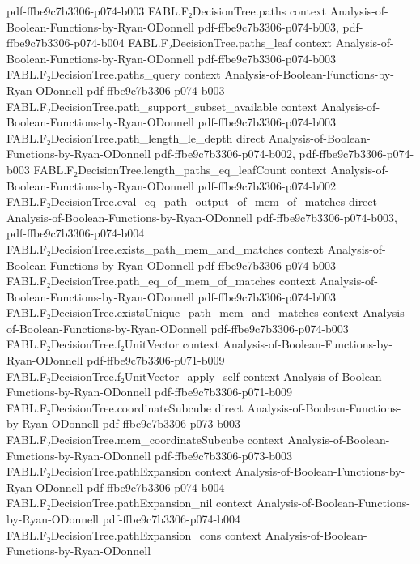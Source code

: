 \begin{theorem}
  {pdf-ffbe9c7b3306-p074-b003}
\proofstep
  {FABL.F₂DecisionTree.paths}
  {context}
  {Analysis-of-Boolean-Functions-by-Ryan-ODonnell}
  {pdf-ffbe9c7b3306-p074-b003,
    pdf-ffbe9c7b3306-p074-b004}
\proofstep
  {FABL.F₂DecisionTree.paths_leaf}
  {context}
  {Analysis-of-Boolean-Functions-by-Ryan-ODonnell}
  {pdf-ffbe9c7b3306-p074-b003}
\proofstep
  {FABL.F₂DecisionTree.paths_query}
  {context}
  {Analysis-of-Boolean-Functions-by-Ryan-ODonnell}
  {pdf-ffbe9c7b3306-p074-b003}
\proofstep
  {FABL.F₂DecisionTree.path_support_subset_available}
  {context}
  {Analysis-of-Boolean-Functions-by-Ryan-ODonnell}
  {pdf-ffbe9c7b3306-p074-b003}
\proofstep
  {FABL.F₂DecisionTree.path_length_le_depth}
  {direct}
  {Analysis-of-Boolean-Functions-by-Ryan-ODonnell}
  {pdf-ffbe9c7b3306-p074-b002,
    pdf-ffbe9c7b3306-p074-b003}
\proofstep
  {FABL.F₂DecisionTree.length_paths_eq_leafCount}
  {context}
  {Analysis-of-Boolean-Functions-by-Ryan-ODonnell}
  {pdf-ffbe9c7b3306-p074-b002}
\proofstep
  {FABL.F₂DecisionTree.eval_eq_path_output_of_mem_of_matches}
  {direct}
  {Analysis-of-Boolean-Functions-by-Ryan-ODonnell}
  {pdf-ffbe9c7b3306-p074-b003,
    pdf-ffbe9c7b3306-p074-b004}
\proofstep
  {FABL.F₂DecisionTree.exists_path_mem_and_matches}
  {context}
  {Analysis-of-Boolean-Functions-by-Ryan-ODonnell}
  {pdf-ffbe9c7b3306-p074-b003}
\proofstep
  {FABL.F₂DecisionTree.path_eq_of_mem_of_matches}
  {context}
  {Analysis-of-Boolean-Functions-by-Ryan-ODonnell}
  {pdf-ffbe9c7b3306-p074-b003}
\proofstep
  {FABL.F₂DecisionTree.existsUnique_path_mem_and_matches}
  {context}
  {Analysis-of-Boolean-Functions-by-Ryan-ODonnell}
  {pdf-ffbe9c7b3306-p074-b003}
\proofstep
  {FABL.F₂DecisionTree.f₂UnitVector}
  {context}
  {Analysis-of-Boolean-Functions-by-Ryan-ODonnell}
  {pdf-ffbe9c7b3306-p071-b009}
\proofstep
  {FABL.F₂DecisionTree.f₂UnitVector_apply_self}
  {context}
  {Analysis-of-Boolean-Functions-by-Ryan-ODonnell}
  {pdf-ffbe9c7b3306-p071-b009}
\proofstep
  {FABL.F₂DecisionTree.coordinateSubcube}
  {direct}
  {Analysis-of-Boolean-Functions-by-Ryan-ODonnell}
  {pdf-ffbe9c7b3306-p073-b003}
\proofstep
  {FABL.F₂DecisionTree.mem_coordinateSubcube}
  {context}
  {Analysis-of-Boolean-Functions-by-Ryan-ODonnell}
  {pdf-ffbe9c7b3306-p073-b003}
\proofstep
  {FABL.F₂DecisionTree.pathExpansion}
  {context}
  {Analysis-of-Boolean-Functions-by-Ryan-ODonnell}
  {pdf-ffbe9c7b3306-p074-b004}
\proofstep
  {FABL.F₂DecisionTree.pathExpansion_nil}
  {context}
  {Analysis-of-Boolean-Functions-by-Ryan-ODonnell}
  {pdf-ffbe9c7b3306-p074-b004}
\proofstep
  {FABL.F₂DecisionTree.pathExpansion_cons}
  {context}
  {Analysis-of-Boolean-Functions-by-Ryan-ODonnell}

\end{theorem}
